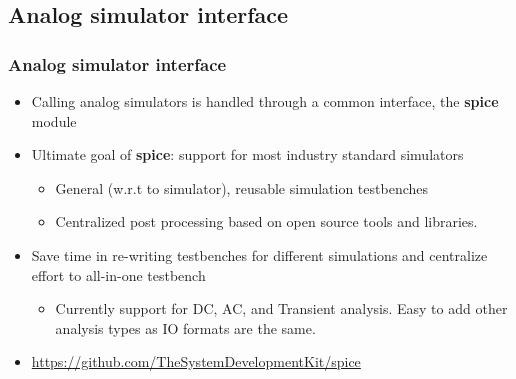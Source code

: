 \documentclass{sdkslides}
\newcommand{\sectname}{Section Name}
\begin{document}

\renewcommand{\sectname}{Analog simulator interface}
\subsection*{\sectname}
\begin{frame}[t]
    \frametitle{\sectname}
    \begin{itemize}
        \item Calling analog simulators is handled through a common interface, the \textbf{spice} module
        \item Ultimate goal of \textbf{spice}: support for most industry standard simulators
        \begin{itemize}
            \item General (w.r.t to simulator), reusable simulation testbenches
            \item Centralized post processing based on open source tools and
                libraries.
        \end{itemize}
            \item Save time in re-writing testbenches for different simulations and centralize effort to all-in-one testbench
        \begin{itemize}
        \item Currently support for DC, AC, and Transient analysis. Easy to
            add other analysis types as IO formats are the same. 
        \end{itemize}
        \item \url{https://github.com/TheSystemDevelopmentKit/spice}
    \end{itemize}
\end{frame}

\renewcommand{\sectname}{Digital simulator interface}
\end{document}
